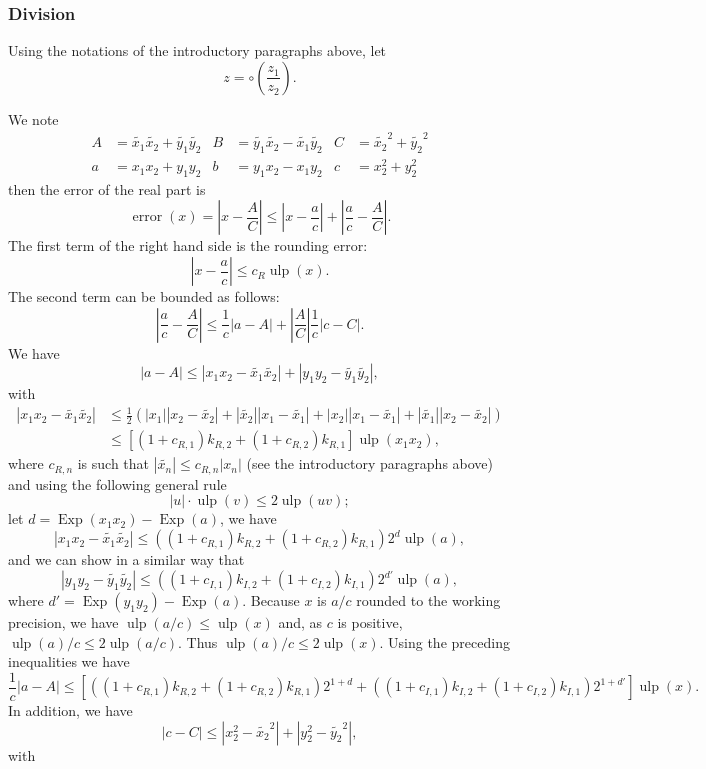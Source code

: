 \documentclass {article}
\newcommand {\corr}[1]{\widetilde {#1}}
\newcommand {\Ulp}{{\operatorname {ulp}}}
\DeclareMathOperator{\Exp}{\operatorname {Exp}}
\newcommand{\error}{\operatorname {error}}
\renewcommand {\leq}{\leqslant}
\begin{document}
\subsubsection {Division}
\label{generic:div}

Using the notations of the introductory paragraphs above, let
\[
z=\circ(\frac{z_1}{z_2}).
\]

We note
\begin{align*}
A&=\corr{x_1}\corr{x_2}+\corr{y_1}\corr{y_2}&
B&=\corr{y_1}\corr{x_2}-\corr{x_1}\corr{y_2}&
C&=\corr{x_2}^2+\corr{y_2}^2\\
a&=x_1x_2+y_1y_2&
b&=y_1x_2-x_1y_2&
c&=x_2^2+y_2^2
\end{align*}
then the error of the real part is
\[
\error(x) = \left|x-\frac{A}{C}\right| \leq \left|x-\frac{a}{c}\right| +
\left|\frac{a}{c}-\frac{A}{C}\right|.
\]
The first term of the right hand side is the rounding error:
\[
\left|x-\frac{a}{c}\right|\leq c_R \Ulp(x).
\]
The second term can be bounded as follows:
\[
\left|\frac{a}{c}-\frac{A}{C}\right| \leq \frac{1}{c} |a-A|
+\left|\frac{A}{C}\right|\frac{1}{c}|c-C|.
\]
We have
\[
|a-A| \leq |x_1x_2-\corr{x_1}\corr{x_2}|
+|y_1y_2-\corr{y_1}\corr{y_2}|,
\]
with
\begin{align*}
|x_1x_2-\corr{x_1}\corr{x_2}| &\leq \frac{1}{2} \left(
|x_1||x_2-\corr{x_2}|+|\corr{x_2}||x_1-\corr{x_1}|
+|x_2||x_1-\corr{x_1}|+|\corr{x_1}||x_2-\corr{x_2}| \right)\\
&\leq \left[ (1+c_{R,1})k_{R,2}+(1+c_{R,2})k_{R,1} \right] \Ulp(x_1x_2),
\end{align*}
where $c_{R,n}$ is such that $|\corr{x_n}| \leq c_{R,n} |x_n|$ (see the
introductory paragraphs above) and using the following general rule
\[
|u|\cdot\Ulp(v) \leq 2\Ulp(uv);
\]
let $d=\Exp(x_1x_2)-\Exp(a)$, we have
\[
|x_1x_2-\corr{x_1}\corr{x_2}| \leq
\left((1+c_{R,1})k_{R,2}+(1+c_{R,2})k_{R,1}\right)2^d \Ulp(a),
\]
and we can show in a similar way that
\[
|y_1y_2-\corr{y_1}\corr{y_2}| \leq \left( (1+c_{I,1})k_{I,2}
+(1+c_{I,2})k_{I,1} \right)2^{d'} \Ulp(a),
\]
where $d'=\Exp(y_1y_2)-\Exp(a)$. Because $x$ is $a/c$ rounded to the working
precision, we have $\Ulp(a/c) \leq \Ulp(x)$ and, as $c$ is positive,
$\Ulp(a)/c \leq 2\Ulp(a/c)$. Thus $\Ulp(a)/c \leq 2\Ulp(x)$. Using the
preceding inequalities we have
\[
\frac{1}{c}|a-A| \leq \left[
\left((1+c_{R,1})k_{R,2}+(1+c_{R,2})k_{R,1}\right)2^{1+d}
+\left((1+c_{I,1})k_{I,2}+(1+c_{I,2})k_{I,1}\right)2^{1+d'}
\right] \Ulp(x).
\]
In addition, we have
\[
|c-C| \leq \left|x_2^2-\corr{x_2}^2\right| +
\left|y_2^2-\corr{y_2}^2\right|,
\]
with
\end{document}
